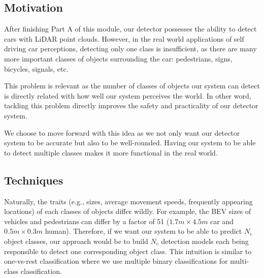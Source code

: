 \documentclass[letter]{article}
\begin{document}
	\subsection{Motivation}

    After finishing Part A of this module, our detector possesses the ability to detect cars with LiDAR point clouds. However, in the real world applications of self driving car perceptions, detecting only one class is insufficient, as there are many more important classes of objects surrounding the car: pedestrians, signs, bicycles, signals, etc. 
    
    This problem is relevant as the number of classes of objects our system can detect is directly related with how well our system perceives the world. In other word, tackling this problem directly improves the safety and practicality of our detector system. 

    We choose to move forward with this idea as we not only want our detector system to be accurate but also to be well-rounded. Having our system to be able to detect multiple classes makes it more functional in the real world. 

	\subsection{Techniques}

    Naturally, the traits (e.g., sizes, average movement speeds, frequently appearing locations) of each classes of objects differ wildly. For example, the BEV sizes of vehicles and pedestrians can differ by a factor of 51 ($ 1.7m \times 4.5m $ car and $ 0.5m \times 0.3m $ human). Therefore, if we want our system to be able to predict $ N_c $ object classes, our approach would be to build $ N_c $ detection models each being responsible to detect one corresponding object class. This intuition is similar to one-vs-rest classification where we use multiple binary classifications for multi-class classification. 
\end{document}
